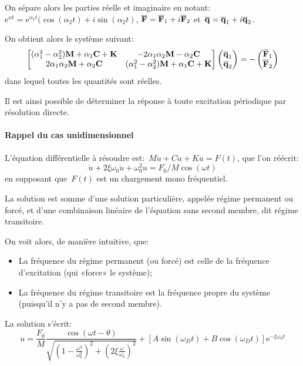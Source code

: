 \medskip
On sépare alors les parties réelle et imaginaire en notant:
$\mathrm{e}^{\alpha t}=\mathrm{e}^{\alpha_1 t}(\cos(\alpha_2 t)+i\sin(\alpha_2 t)$, $\VV{\overline{F}}=\VV{\overline{F}}_1
+i\VV{\overline{F}}_2$ et~$\VV{\overline{q}}=\VV{\overline{q}}_1+i\VV{\overline{q}}_2$.

On obtient alors le système suivant:
\begin{equation}
\MM*{(\alpha_1^2-\alpha_2^2)\MM{M}+\alpha_1\MM{C}+\MM{K} & -2\alpha_1\alpha_2\MM{M}-\alpha_2\MM{C}\\
2\alpha_1\alpha_2\MM{M}+\alpha_2\MM{C} & (\alpha_1^2-\alpha_2^2)\MM{M}+\alpha_1\MM{C}+\MM{K}}
\VV*{\VV{\overline{q}}_1\\ \VV{\overline{q}}_2}
=
-\VV*{\VV{\overline{F}}_1\\ \VV{\overline{F}}_2}
\end{equation}
dans lequel toutes les quantités sont réelles.

Il est ainsi possible de déterminer la réponse à toute excitation périodique par résolution directe.

\medskip
{}

\medskip
{}
\paragraph{Rappel du cas unidimensionnel}
L'équation différentielle à résoudre est:~$M\ddot{u}+C\dot{u}+Ku=F(t)$, que l'on
réécrit: \begin{equation} \ddot{u}+2\xi\omega_0\dot{u}+\omega^2_0 u=F_0/M \cos(\omega t)\end{equation}
en supposant que~$F(t)$ est un chargement mono fréquentiel.

La solution est somme d'une solution particulière, appelée régime permanent ou forcé, et d'une
combinaison linéaire de l'équation sans second membre, dit régime transitoire.

On voit alors, de manière intuitive, que:
\begin{itemize}%
  \item La fréquence du régime permanent (ou forcé) est celle de la fréquence d'excitation (qui «force» le système);
  \item La fréquence du régime transitoire est la fréquence propre du système (puisqu'il n'y a pas de second membre).
\end{itemize}
La solution s'écrit:
\begin{equation}
u = \dfrac{F_0}M\dfrac{\cos(\omega t-\theta)}{\sqrt{\left(1-\frac{\omega^2}{\omega_0^2}\right)^2+\left(2\xi\frac{\omega}{\omega_0}\right)^2}}
+\left[A\sin (\omega_D t)+B\cos(\omega_D t)\right] \mathrm{e}^{-\xi\omega_0 t}
\end{equation}

